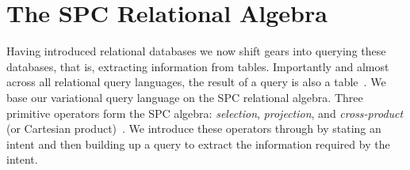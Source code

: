 \section{The SPC Relational Algebra}
\label{sec:ra}

Having introduced relational databases we now shift gears into querying
these databases, that is, extracting information from tables. Importantly
and almost across all relational query languages, the result of a query 
is also a table~\cite{AliceBook}. 
%
We base our variational query language on the SPC relational algebra.
Three primitive operators form the SPC algebra: \emph{selection}, \emph{projection},
and \emph{cross-product} (or Cartesian product)~\cite{AliceBook}.
We introduce these operators through  by stating an intent and then
building up a query to extract the information required by the intent. 

